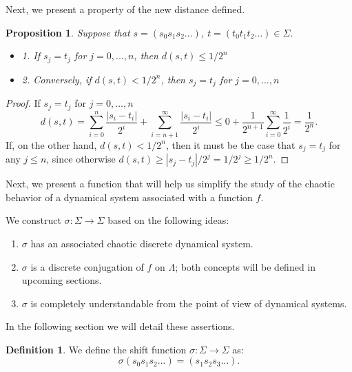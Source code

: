 \documentclass[12pt,a4paper]{report}
\newtheorem{proposicion}{Proposition}[section]
\theoremstyle{definition}
\newtheorem{definicion}{Definition}[section]
\begin{document}
Next, we present a property of the new distance defined.

\begin{proposicion}
    
Suppose that \(s=(s_{0}s_{1}s_{2}...)\), \(t=(t_{0}t_{1}t_{2}...)\in\Sigma\).
\begin{itemize}
    \item 1. If \(s_{j}=t_{j}\) for \(j=0,...,n\), then \(d(s,t)\le1/2^{n}\)
    \item2. Conversely, if \(d(s,t)<1/2^{n}\), then \(s_{j}=t_{j}\) for \(j=0,...,n\)
\end{itemize}

\end{proposicion}

\begin{proof}

If \(s_{j}=t_{j}\) for \(j=0,...,n\)
\[
d(s,t)=\sum_{i=0}^{n}\frac{|s_{i}-t_{i}|}{2^{i}}+\sum_{i=n+1}^{\infty}\frac{|s_{i}-t_{i}|}{2^{i}}
\le0+\frac{1}{2^{n+1}}\sum_{i=0}^{\infty}\frac{1}{2^{i}} =\frac{1}{2^{n}}.
\]
%
If, on the other hand, \(d(s,t)<1/2^{n}\), then it must be the case that \(s_{j}=t_{j}\) for any \(j\le n\), since otherwise \(d(s,t)\ge|s_{j}-t_{j}|/2^{j}=1/2^{j}\ge1/2^{n}\).

\end{proof}


Next, we present a function that will help us simplify the study of the chaotic behavior of a dynamical system associated with a function $f$.

We construct \(\sigma:\Sigma\rightarrow\Sigma\) based on the following ideas:
\begin{enumerate}
    \item \(\sigma\) has an associated chaotic discrete dynamical system.
    \item  \(\sigma\) is a discrete conjugation of \(f\) on \(\Lambda\); both concepts will be defined in upcoming sections. 
    \item \(\sigma\) is completely understandable from the point of view of dynamical systems.
\end{enumerate}

In the following section we will detail these assertions.

\begin{definicion}
    
We define the shift function \(\sigma:\Sigma\rightarrow\Sigma\) as:
\[
\sigma(s_{0}s_{1}s_{2}...)=(s_{1}s_{2}s_{3}...).
\]
%
\end{definicion}
\end{document}
